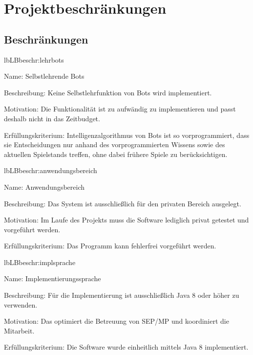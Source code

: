 \chapter{Projektbeschränkungen}

\section{Beschränkungen}

\setcounter{lb}{10}

\begin{description}[leftmargin=5em, style=sameline]
	
	\begin{lhp}{lb}{LB}{beschr:lehrbots}
		\item [Name:] Selbstlehrende Bots
		\item [Beschreibung:] Keine Selbstlehrfunktion von Bots wird implementiert.
		\item [Motivation:] Die Funktionalität ist zu aufwändig zu implementieren und passt deshalb nicht in das Zeitbudget.
		\item [Erfüllungskriterium:] Intelligenzalgorithmus von Bots ist so vorprogrammiert, dass sie Entscheidungen nur anhand des vorprogrammierten Wissens sowie des aktuellen Spielstands treffen, ohne dabei frühere Spiele zu berücksichtigen.
	\end{lhp}
	
	\begin{lhp}{lb}{LB}{beschr:anwendungsbereich}
		\item [Name:] Anwendungsbereich
		\item [Beschreibung:] Das System ist ausschließlich für den privaten Bereich ausgelegt.
		\item [Motivation:] Im Laufe des Projekts muss die Software lediglich privat getestet und vorgeführt werden.
		\item [Erfüllungskriterium:] Das Programm kann fehlerfrei vorgeführt werden.
	\end{lhp}
	
		
	\begin{lhp}{lb}{LB}{beschr:implsprache}
		\item [Name:] Implementierungssprache
		\item [Beschreibung:] Für die Implementierung ist ausschließlich Java 8 oder höher zu verwenden.
		\item [Motivation:] Das optimiert die Betreuung von SEP/MP und koordiniert die Mitarbeit.
		\item [Erfüllungskriterium:] Die Software wurde einheitlich mittels Java 8 implementiert.
	\end{lhp}
	

\end{description}
